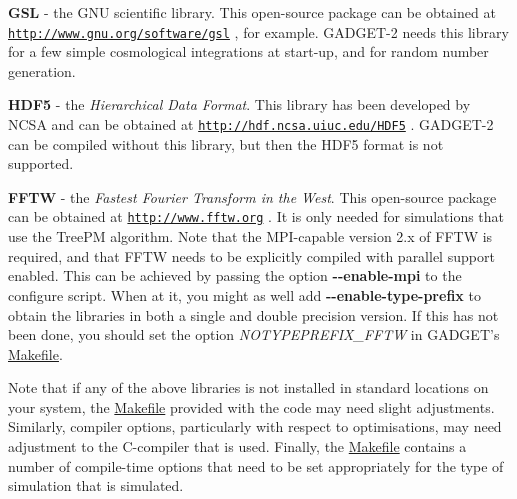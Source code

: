 \begin{DoxyItemize}
\item {\bfseries \-G\-S\-L} -\/ the \-G\-N\-U scientific library. \-This open-\/source package can be obtained at \href{http://www.gnu.org/software/gsl}{\tt http\-://www.\-gnu.\-org/software/gsl} , for example. \-G\-A\-D\-G\-E\-T-\/2 needs this library for a few simple cosmological integrations at start-\/up, and for random number generation.
\end{DoxyItemize}


\begin{DoxyItemize}
\item {\bfseries \-H\-D\-F5} -\/ the {\itshape \-Hierarchical \-Data \-Format\/}. \-This library has been developed by \-N\-C\-S\-A and can be obtained at \href{http://hdf.ncsa.uiuc.edu/HDF5}{\tt http\-://hdf.\-ncsa.\-uiuc.\-edu/\-H\-D\-F5} . \-G\-A\-D\-G\-E\-T-\/2 can be compiled without this library, but then the \-H\-D\-F5 format is not supported.
\end{DoxyItemize}


\begin{DoxyItemize}
\item {\bfseries \-F\-F\-T\-W} -\/ the {\itshape \-Fastest \-Fourier \-Transform in the \-West\/}. \-This open-\/source package can be obtained at \href{http://www.fftw.org}{\tt http\-://www.\-fftw.\-org} . \-It is only needed for simulations that use the \-Tree\-P\-M algorithm. \-Note that the \-M\-P\-I-\/capable version 2.\-x of \-F\-F\-T\-W is required, and that \-F\-F\-T\-W needs to be explicitly compiled with parallel support enabled. \-This can be achieved by passing the option {\bfseries -\/-\/enable-\/mpi} to the configure script. \-When at it, you might as well add {\bfseries -\/-\/enable-\/type-\/prefix} to obtain the libraries in both a single and double precision version. \-If this has not been done, you should set the option {\itshape \-N\-O\-T\-Y\-P\-E\-P\-R\-E\-F\-I\-X\-\_\-\-F\-F\-T\-W\/} in \-G\-A\-D\-G\-E\-T's \hyperlink{Gadget-Makefile}{\-Makefile}.
\end{DoxyItemize}

\-Note that if any of the above libraries is not installed in standard locations on your system, the \hyperlink{Gadget-Makefile}{\-Makefile} provided with the code may need slight adjustments. \-Similarly, compiler options, particularly with respect to optimisations, may need adjustment to the \-C-\/compiler that is used. \-Finally, the \hyperlink{Gadget-Makefile}{\-Makefile} contains a number of compile-\/time options that need to be set appropriately for the type of simulation that is simulated.

